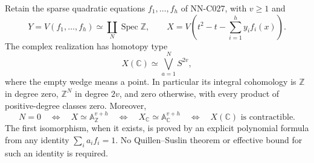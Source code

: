 \begin{proposition}
Retain the sparse quadratic equations $f_1,\ldots,f_h$ of NN-C027,
with $v\geq1$ and
\[
 Y=V(f_1,\ldots,f_h)\simeq\coprod_N\operatorname{Spec}\mathbb Z,
 \qquad
 X=V\left(t^2-t-\sum_{i=1}^h y_i f_i(x)\right).
\]
The complex realization has homotopy type
\[
                      X(\mathbb C)\simeq\bigvee_{a=1}^{N}S^{2v},
\]
where the empty wedge means a point. In particular its integral
cohomology is $\mathbb Z$ in degree zero, $\mathbb Z^N$ in degree $2v$,
and zero otherwise, with every product of positive-degree classes zero.
Moreover,
\[
 N=0\quad\Longleftrightarrow\quad
 X\simeq\mathbb A^{v+h}_{\mathbb Z}
 \quad\Longleftrightarrow\quad
 X_{\mathbb C}\simeq\mathbb A^{v+h}_{\mathbb C}
 \quad\Longleftrightarrow\quad X(\mathbb C)\text{ is contractible}.
\]
The first isomorphism, when it exists, is proved by an explicit
polynomial formula from any identity $\sum_i a_i f_i=1$.
No Quillen--Suslin theorem or effective bound for such an identity is
required.
\end{proposition}

